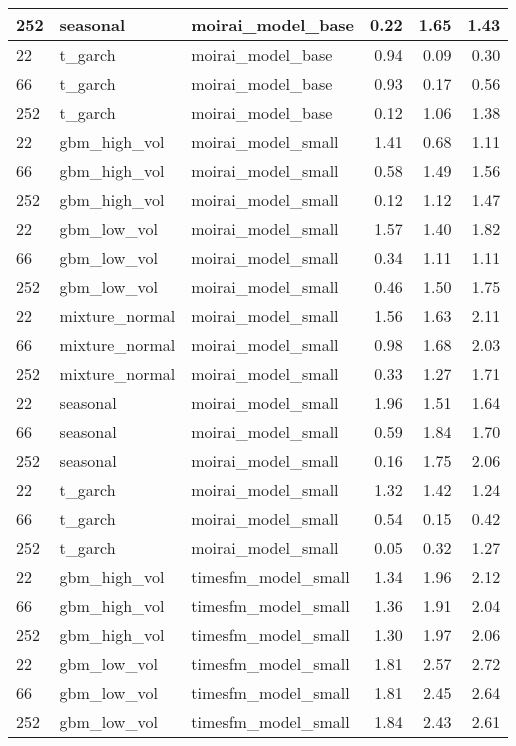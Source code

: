{\begin{tabular}{lllrrr}
252 & seasonal & moirai\_model\_base & 0.22 & 1.65 & 1.43 \\
\midrule
22 & t\_garch & moirai\_model\_base & 0.94 & 0.09 & 0.30 \\
66 & t\_garch & moirai\_model\_base & 0.93 & 0.17 & 0.56 \\
252 & t\_garch & moirai\_model\_base & 0.12 & 1.06 & 1.38 \\
\midrule
22 & gbm\_high\_vol & moirai\_model\_small & 1.41 & 0.68 & 1.11 \\
66 & gbm\_high\_vol & moirai\_model\_small & 0.58 & 1.49 & 1.56 \\
252 & gbm\_high\_vol & moirai\_model\_small & 0.12 & 1.12 & 1.47 \\
\midrule
22 & gbm\_low\_vol & moirai\_model\_small & 1.57 & 1.40 & 1.82 \\
66 & gbm\_low\_vol & moirai\_model\_small & 0.34 & 1.11 & 1.11 \\
252 & gbm\_low\_vol & moirai\_model\_small & 0.46 & 1.50 & 1.75 \\
\midrule
22 & mixture\_normal & moirai\_model\_small & 1.56 & 1.63 & 2.11 \\
66 & mixture\_normal & moirai\_model\_small & 0.98 & 1.68 & 2.03 \\
252 & mixture\_normal & moirai\_model\_small & 0.33 & 1.27 & 1.71 \\
\midrule
22 & seasonal & moirai\_model\_small & 1.96 & 1.51 & 1.64 \\
66 & seasonal & moirai\_model\_small & 0.59 & 1.84 & 1.70 \\
252 & seasonal & moirai\_model\_small & 0.16 & 1.75 & 2.06 \\
\midrule
22 & t\_garch & moirai\_model\_small & 1.32 & 1.42 & 1.24 \\
66 & t\_garch & moirai\_model\_small & 0.54 & 0.15 & 0.42 \\
252 & t\_garch & moirai\_model\_small & 0.05 & 0.32 & 1.27 \\
\midrule
22 & gbm\_high\_vol & timesfm\_model\_small & 1.34 & 1.96 & 2.12 \\
66 & gbm\_high\_vol & timesfm\_model\_small & 1.36 & 1.91 & 2.04 \\
252 & gbm\_high\_vol & timesfm\_model\_small & 1.30 & 1.97 & 2.06 \\
\midrule
22 & gbm\_low\_vol & timesfm\_model\_small & 1.81 & 2.57 & 2.72 \\
66 & gbm\_low\_vol & timesfm\_model\_small & 1.81 & 2.45 & 2.64 \\
252 & gbm\_low\_vol & timesfm\_model\_small & 1.84 & 2.43 & 2.61 \\

\end{tabular}}
